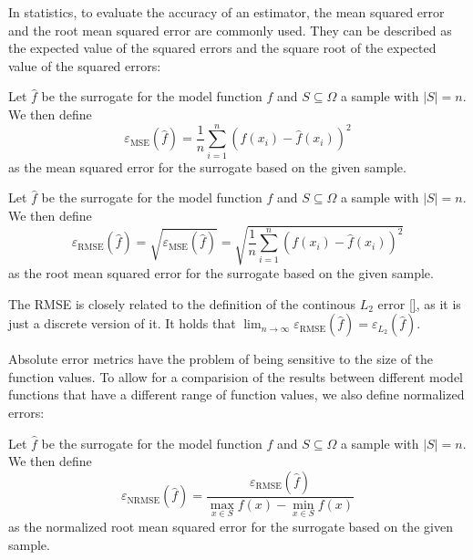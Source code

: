 \documentclass[
  a4paper,  %
  twoside,  %
  bibliography=totoc,
  headsepline,
  cleardoublepage=empty,
  parskip=half,
  draft=false
]{scrbook}
\begin{document}
In statistics, to evaluate the accuracy of an estimator, the mean squared error and the root mean squared error are commonly used.
They can be described as the expected value of the squared errors and the square root of the expected value of the squared errors:
\begin{definition}
Let $\hat{f}$ be the surrogate for the model function $f$ and $S \subseteq \Omega$ a sample with $|S|=n$.
We then define
\begin{equation}
\varepsilon_{\text{MSE}}(\hat{f}) = \frac{1}{n} \sum_{i=1}^n (f(x_i) - \hat{f}(x_i))^2
\end{equation}
as the mean squared error for the surrogate based on the given sample.
\end{definition}

\begin{definition}
Let $\hat{f}$ be the surrogate for the model function $f$ and $S \subseteq \Omega$ a sample with $|S|=n$.
We then define
\begin{equation}
\varepsilon_{\text{RMSE}}(\hat{f}) = \sqrt{\varepsilon_{\text{MSE}}(\hat{f})} = \sqrt{\frac{1}{n} \sum_{i=1}^n (f(x_i) - \hat{f}(x_i))^2}
\end{equation}
as the root mean squared error for the surrogate based on the given sample.
\end{definition}

The RMSE is closely related to the definition of the continous $L_2$ error \ref{}, as it is just a discrete version of it.
It holds that $\lim_{n \to \infty} \varepsilon_{\text{RMSE}}(\hat{f}) = \varepsilon_{\text{$L_2$}}(\hat{f})$.


Absolute error metrics have the problem of being sensitive to the size of the function values.
To allow for a comparision of the results between different model functions that have a different range of function values, we also define normalized errors:
\begin{definition}
Let $\hat{f}$ be the surrogate for the model function $f$ and $S \subseteq \Omega$ a sample with $|S|=n$.
We then define
\begin{equation}
\varepsilon_{\text{NRMSE}}(\hat{f}) = \frac{\varepsilon_{\text{RMSE}}(\hat{f})}{\max_{x \in S} f(x) - \min_{x \in S} f(x)}
\end{equation}
as the normalized root mean squared error for the surrogate based on the given sample.
\end{definition}
\end{document}
